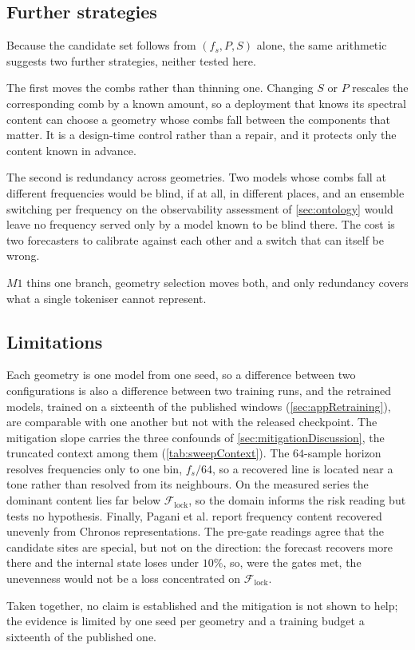 \subsection*{Further strategies}

Because the candidate set follows from $(f_s,P,S)$ alone, the same arithmetic suggests two further strategies, neither tested here.

The first moves the combs rather than thinning one. Changing $S$ or $P$ rescales the corresponding comb by a known amount, so a deployment that knows its spectral content can choose a geometry whose combs fall between the components that matter. It is a design-time control rather than a repair, and it protects only the content known in advance.

The second is redundancy across geometries. Two models whose combs fall at different frequencies would be blind, if at all, in different places, and an ensemble switching per frequency on the observability assessment of \autoref{sec:ontology} would leave no frequency served only by a model known to be blind there. The cost is two forecasters to calibrate against each other and a switch that can itself be wrong.

$M1$ thins one branch, geometry selection moves both, and only redundancy covers what a single tokeniser cannot represent.
\endgroup

\subsection{Limitations}\label{sec:limitations}
Each geometry is one model from one seed, so a difference between two configurations is also a difference between two training runs, and the retrained models, trained on a sixteenth of the published windows (\autoref{sec:appRetraining}), are comparable with one another but not with the released checkpoint. The mitigation slope carries the three confounds of \autoref{sec:mitigationDiscussion}, the truncated context among them (\autoref{tab:sweepContext}). The $64$-sample horizon resolves frequencies only to one bin, $f_s/64$, so a recovered line is located near a tone rather than resolved from its neighbours. On the measured series the dominant content lies far below $\mathcal F_{\mathrm{lock}}$, so the domain informs the risk reading but tests no hypothesis. Finally, Pagani et al\@. report frequency content recovered unevenly from Chronos representations. The pre-gate readings agree that the candidate sites are special, but not on the direction: the forecast recovers more there and the internal state loses under $10\%$, so, were the gates met, the unevenness would not be a loss concentrated on $\mathcal F_{\mathrm{lock}}$.

Taken together, no claim is established and the mitigation is not shown to help; the evidence is limited by one seed per geometry and a training budget a sixteenth of the published one.
